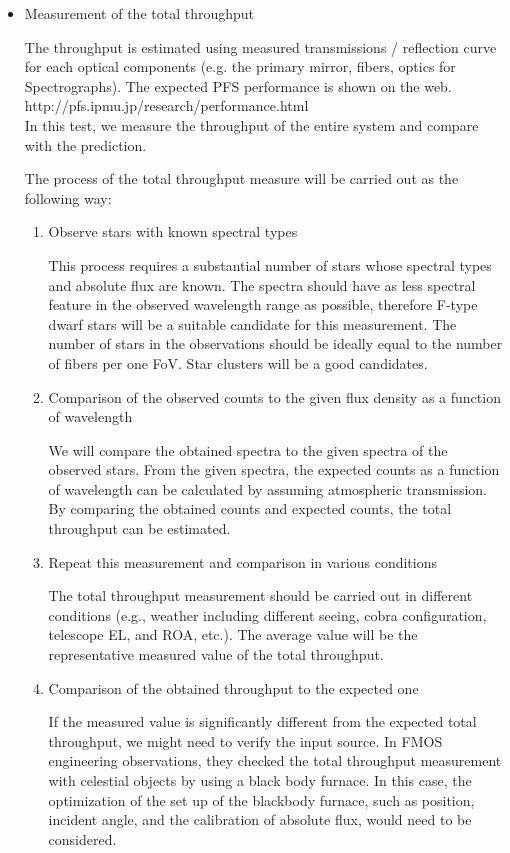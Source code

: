 \begin{itemize}
\item{Measurement of the total throughput}

The throughput is estimated using measured transmissions / reflection curve for each optical components (e.g. the primary mirror, fibers, optics for Spectrographs).
The expected PFS performance is shown on the web.\\
\hspace*{10mm} http://pfs.ipmu.jp/research/performance.html \\
In this test, we measure the throughput of the entire system and compare with the prediction.

The process of the total throughput measure will be carried out as the following way:

\begin{enumerate}
\item{Observe stars with known spectral types}

This process requires a substantial number of stars whose spectral types and absolute flux are known. The spectra should have as less spectral feature in the observed wavelength range as possible, therefore F-type dwarf stars will be a suitable candidate for this measurement. The number of stars in the observations should be ideally equal to the number of fibers per one FoV. Star clusters will be a good candidates.

\item{Comparison of the observed counts to the given flux density as a function of wavelength}

We will compare the obtained spectra to the given spectra of the observed stars. From the given spectra, the expected counts as a function of wavelength can be calculated by assuming atmospheric transmission. By comparing the obtained counts and expected counts, the total throughput can be estimated.

\item{Repeat this measurement and comparison in various conditions}

The total throughput measurement should be carried out in different conditions (e.g., weather including different seeing, cobra configuration, telescope EL, and ROA, etc.). The average value will be the representative measured value of the total throughput. 

\item{Comparison of the obtained throughput to the expected one}

If the measured value is significantly different from the expected total throughput, we might need to verify the input source. In FMOS engineering observations, they checked the total throughput measurement with celestial objects by using a black body furnace. In this case, the optimization of the set up of the blackbody furnace, such as position, incident angle, and the calibration of absolute flux, would need to be considered.


\end{enumerate}
\end{itemize}
